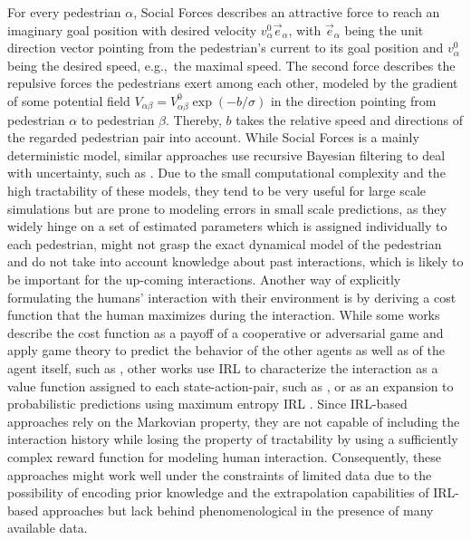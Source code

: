 For every pedestrian $\alpha$, Social Forces describes an attractive force to reach an imaginary goal position with desired velocity $v^0_{\alpha} \vec{e}_{\alpha}$, with $\vec{e}_{\alpha}$ being the unit direction vector pointing from the pedestrian's current to its goal position and $v^0_{\alpha}$ being the desired speed, e.g.,\ the maximal speed. The second force describes the repulsive forces the pedestrians exert among each other, modeled by the gradient of some potential field $V_{\alpha \beta} = V_{\alpha \beta}^0 \exp(-b / \sigma)$ in the direction pointing from pedestrian $\alpha$ to pedestrian $\beta$. Thereby, $b$ takes the relative speed and directions of the regarded pedestrian pair into account. While Social Forces is a mainly deterministic model, similar approaches use recursive Bayesian filtering to deal with uncertainty, such as \cite{Schneider2013}\cite{Rehder2015}\cite{Guo2016}. Due to the small computational complexity and the high tractability of these models, they tend to be very useful for large scale simulations but are prone to modeling errors in small scale predictions, as they widely hinge on a set of estimated parameters which is assigned individually to each pedestrian, might not grasp the exact dynamical model of the pedestrian and do not take into account knowledge about past interactions, which is likely to be important for the up-coming interactions.
\newline
Another way of explicitly formulating the humans' interaction with their environment is by deriving a cost function that the human maximizes during the interaction. While some works describe the cost function as a payoff of a cooperative or adversarial game and apply game theory to predict the behavior of the other agents as well as of the agent itself, such as \cite{Bouzat2014}\cite{Nikolaidis2017}, other works use \ac{IRL} \cite{Ng2000} to characterize the interaction as a value function assigned to each state-action-pair, such as \cite{Fahad2018}\cite{Fernando2019}\cite{Saleh2018}, or as an expansion to probabilistic predictions using maximum entropy \ac{IRL} \cite{Ziebart2008}. Since IRL-based approaches rely on the Markovian property, they are not capable of including the interaction history while losing the property of tractability by using a sufficiently complex reward function for modeling human interaction. Consequently, these approaches might work well under the constraints of limited data due to the possibility of encoding prior knowledge and the extrapolation capabilities of \ac{IRL}-based approaches but lack behind phenomenological in the presence of many available data.

